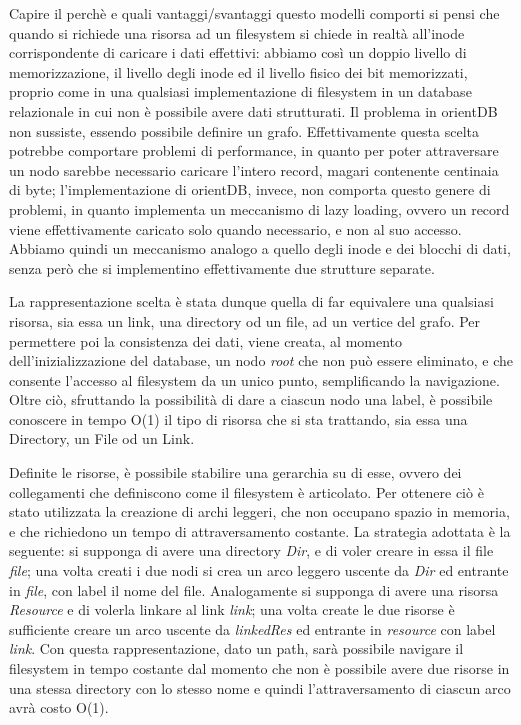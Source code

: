 Capire il perchè e quali vantaggi/svantaggi questo modelli comporti si pensi che quando si richiede una risorsa ad un filesystem si chiede in realtà all'inode corrispondente di caricare i dati effettivi: abbiamo così un doppio livello di memorizzazione, il livello degli inode ed il livello fisico dei bit memorizzati, proprio come in una qualsiasi implementazione di filesystem in un database relazionale in cui non è possibile avere dati strutturati. Il problema in orientDB non sussiste, essendo possibile definire un grafo. Effettivamente questa scelta potrebbe comportare problemi di performance, in quanto per poter attraversare un nodo sarebbe necessario caricare l'intero record, magari contenente centinaia di byte; l'implementazione di orientDB, invece, non comporta questo genere di problemi, in quanto implementa un meccanismo di lazy loading, ovvero un record viene effettivamente caricato solo quando necessario, e non al suo accesso. Abbiamo quindi un meccanismo analogo a quello degli inode e dei blocchi di dati, senza però che si implementino effettivamente due strutture separate.

 La rappresentazione scelta è stata dunque quella di far equivalere una qualsiasi risorsa, sia essa un link, una directory od un file, ad un vertice del grafo. Per permettere poi la consistenza dei dati, viene creata, al momento dell'inizializzazione del database, un nodo \emph{root} che non può essere eliminato, e che consente l'accesso al filesystem da un unico punto, semplificando la navigazione. Oltre ciò, sfruttando la possibilità di dare a ciascun nodo una label, è possibile conoscere in tempo O(1) il tipo di risorsa che si sta trattando, sia essa una Directory, un File od un Link.
 
 Definite le risorse, è possibile stabilire una gerarchia su di esse, ovvero dei collegamenti che definiscono come il filesystem è articolato. Per ottenere ciò è stato utilizzata la creazione di archi leggeri, che non occupano spazio in memoria, e che richiedono un tempo di attraversamento costante. La strategia adottata è la seguente: si supponga di avere una directory \emph{Dir}, e di voler creare in essa il file \emph{file}; una volta creati i due nodi si crea un arco leggero uscente da \emph{Dir} ed entrante in \emph{file}, con label il nome del file. Analogamente si supponga di avere una risorsa \emph{Resource} e di volerla linkare al link \emph{link}; una volta create le due risorse è sufficiente creare un arco uscente da \emph{linkedRes} ed entrante in \emph{resource} con label \emph{link}. Con questa rappresentazione, dato un path, sarà possibile navigare il filesystem in tempo costante dal momento che non è possibile avere due risorse in una stessa directory con lo stesso nome e quindi l'attraversamento di ciascun arco avrà costo O(1).
 
